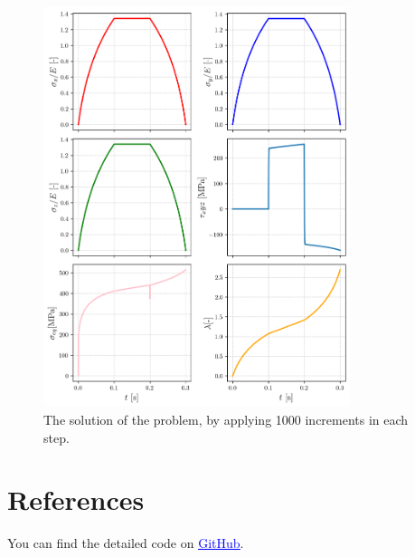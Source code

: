 \documentclass[12pt,a4paper]{article}
\begin{document}
\begin{figure}[h]
    \centering
    \includegraphics[width=0.8\textwidth]{figures/sol_1000incr.png}
    \caption{The solution of the problem, by applying 1000 increments in each step.}
    \label{fig:sol_1000incr}
\end{figure}

\newpage

\section*{References}

You can find the detailed code on \href{https://github.com/zsoca000/Finite-elastic-deformations-HW2/blob/main/calculations.ipynb}{\textcolor{blue}{\underline{GitHub}}}.
\end{document}
